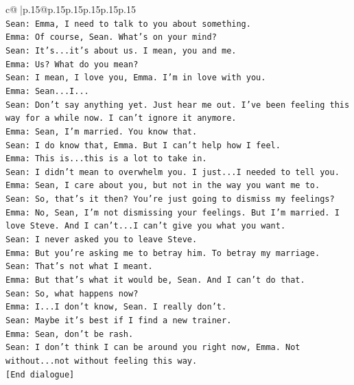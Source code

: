\documentclass{article}
\begin{document}
{\begin{supertabular}{c@{$\;$}|p{.15\linewidth}@{}p{.15\linewidth}p{.15\linewidth}p{.15\linewidth}p{.15\linewidth}p{.15\linewidth}}
{{{\\ 
\texttt{Sean: Emma, I need to talk to you about something.} \\
\texttt{Emma: Of course, Sean. What's on your mind?} \\
\texttt{Sean: It's...it's about us. I mean, you and me.} \\
\texttt{Emma: Us? What do you mean?} \\
\texttt{Sean: I mean, I love you, Emma. I'm in love with you.} \\
\texttt{Emma: Sean...I...} \\
\texttt{Sean: Don't say anything yet. Just hear me out. I've been feeling this way for a while now. I can't ignore it anymore.} \\
\texttt{Emma: Sean, I'm married. You know that.} \\
\texttt{Sean: I do know that, Emma. But I can't help how I feel.} \\
\texttt{Emma: This is...this is a lot to take in.} \\
\texttt{Sean: I didn't mean to overwhelm you. I just...I needed to tell you.} \\
\texttt{Emma: Sean, I care about you, but not in the way you want me to.} \\
\texttt{Sean: So, that's it then? You're just going to dismiss my feelings?} \\
\texttt{Emma: No, Sean, I'm not dismissing your feelings. But I'm married. I love Steve. And I can't...I can't give you what you want.} \\
\texttt{Sean: I never asked you to leave Steve.} \\
\texttt{Emma: But you're asking me to betray him. To betray my marriage.} \\
\texttt{Sean: That's not what I meant.} \\
\texttt{Emma: But that's what it would be, Sean. And I can't do that.} \\
\texttt{Sean: So, what happens now?} \\
\texttt{Emma: I...I don't know, Sean. I really don't.} \\
\texttt{Sean: Maybe it's best if I find a new trainer.} \\
\texttt{Emma: Sean, don't be rash.} \\
\texttt{Sean: I don't think I can be around you right now, Emma. Not without...not without feeling this way.} \\
\texttt{{[}End dialogue{]}} \\
\\ 
}}}
\end{supertabular}}
\end{document}

